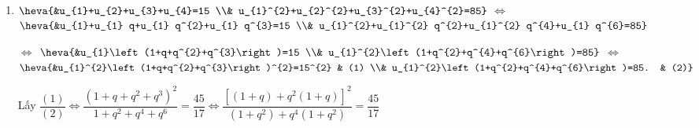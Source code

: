 \begin{vd}
{\begin{enumerate}
			Lấy $\dfrac{(1)}{(2)} \Leftrightarrow \dfrac{1+q^{5}}{q^{2}(1+q)}=\dfrac{11}{4} \Leftrightarrow \dfrac{(1+q)\left(1-q+q^{2}-q^{3}+q^{4}\right)}{q^{2}(1+q)}=\dfrac{11}{4}$\\
			$\Leftrightarrow 4\left(1-q+q^{2}-q^{3}+q^{4}\right)=11 q^{2} \Leftrightarrow 4 q^{4}-4 q^{3}-7 q^{2}-4 q+4=0$\\
			$\Leftrightarrow \dfrac{4 q^{4}}{q^{2}}-\dfrac{4 q^{3}}{q^{2}}-\dfrac{7 q^{2}}{q^{2}}-\dfrac{4 q}{q^{2}}+\dfrac{4}{q^{2}}=0 \Leftrightarrow 4\left(q^{2}+\dfrac{1}{q^{2}}\right)-4\left(q+\dfrac{1}{q}\right)-7=0 \quad (*)$\\
			Đặt $t=q+\dfrac{1}{q} \Rightarrow t^{2}=\left(q+\dfrac{1}{q}\right)^{2} \Rightarrow q^{2}+\dfrac{1}{q^{2}}=t^{2}-2$. Điều kiện: $|t| \geq 2$.\\
			$(*) \Leftrightarrow 4\left(t^{2}-2\right)-4 t-7=0 \Leftrightarrow 4 t^{2}-4 t-15=0 \Leftrightarrow \hoac{&t=\dfrac{5}{2} \\& t=-\dfrac{3}{2}.\quad (\text{Loại})}$\\
			Với $t=\dfrac{5}{2} \Leftrightarrow q+\dfrac{1}{q}=\dfrac{5}{2} \Leftrightarrow 2 q^{2}-5 q+2=0 \Leftrightarrow \hoac{&q=2 \\& q=\dfrac{1}{2}.}$
			\begin{itemize}
				\item Với $q=2 \Rightarrow u_{1}=\dfrac{165}{1+q^{5}}=\dfrac{165}{1^{2}+2^{5}}=5$.
				\item Với $q=\dfrac{1}{2} \Rightarrow u_{1}=\dfrac{165}{1+q^{2}}=\dfrac{165}{1+\left(\frac{1}{2}\right)^{5}}=160$.
			\end{itemize}
			\item $ \heva{&u_{1}+u_{2}+u_{3}+u_{4}=15 \\& u_{1}^{2}+u_{2}^{2}+u_{3}^{2}+u_{4}^{2}=85} $ $ \Leftrightarrow $
			$ \heva{&u_{1}+u_{1} q+u_{1} q^{2}+u_{1} q^{3}=15 \\& u_{1}^{2}+u_{1}^{2} q^{2}+u_{1}^{2} q^{4}+u_{1} q^{6}=85} $
			
			$ \Leftrightarrow $ $ \heva{&u_{1}\left(1+q+q^{2}+q^{3}\right)=15 \\& u_{1}^{2}\left(1+q^{2}+q^{4}+q^{6}\right)=85} $ $ \Leftrightarrow $
			$ \heva{&u_{1}^{2}\left(1+q+q^{2}+q^{3}\right)^{2}=15^{2} & (1) \\& u_{1}^{2}\left(1+q^{2}+q^{4}+q^{6}\right)=85. & (2)} $
			
			Lấy $\dfrac{(1)}{(2)} \Leftrightarrow \dfrac{\left(1+q+q^{2}+q^{3}\right)^{2}}{1+q^{2}+q^{4}+q^{6}}=\dfrac{45}{17} \Leftrightarrow \dfrac{\left[(1+q)+q^{2}(1+q)\right]^{2}}{\left(1+q^{2}\right)+q^{4}\left(1+q^{2}\right)}=\dfrac{45}{17}$
			

\end{enumerate}}
\end{vd}
